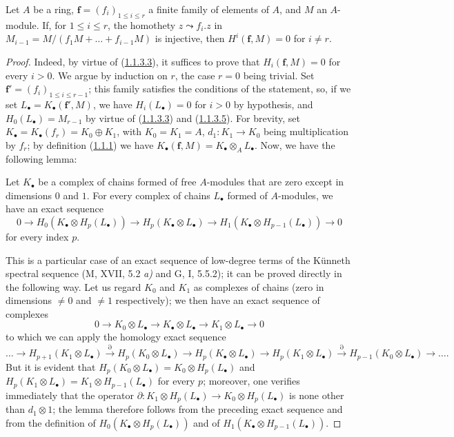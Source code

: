 \begin{proposition}[1.1.4]
\label{III.1.1.4}
Let $A$ be a ring, $\mathbf f=(f_i)_{1\leq i\leq r}$ a finite family
of elements of $A$, and $M$ an $A$-module. If, for $1\leq i\leq r$, the
homothety $z\leadsto f_i.z$ in $M_{i-1}=M/(f_1M+\ldots+f_{i-1}M)$ is injective,
then $H^i(\mathbf f,M)=0$ for $i\neq r$.
\end{proposition}

\begin{proof}
Indeed, by virtue of (\hyperref[III.1.1.3.3]{1.1.3.3}), it suffices to
prove that $H_i(\mathbf f,M)=0$ for every $i>0$. We argue by induction on
$r$, the case $r=0$ being trivial. Set
$\mathbf f'=(f_i)_{1\leq i\leq r-1}$; this family satisfies the conditions of
the statement, so, if we set $L_\bullet=K_\bullet(\mathbf f',M)$, we have
$H_i(L_\bullet)=0$ for $i>0$ by hypothesis, and
$H_0(L_\bullet)=M_{r-1}$ by virtue of
(\hyperref[III.1.1.3.3]{1.1.3.3}) and
(\hyperref[III.1.1.3.5]{1.1.3.5}). For brevity, set
$K_\bullet=K_\bullet(f_r)=K_0\oplus K_1$, with $K_0=K_1=A$,
$d_1:K_1\to K_0$ being multiplication by $f_r$; by definition
(\hyperref[III.1.1.1]{1.1.1}) we have
$K_\bullet(\mathbf f,M)=K_\bullet\otimes_A L_\bullet$. Now, we have the
following lemma:

\begin{lemma}[1.1.4.1]
\label{III.1.1.4.1}
Let $K_\bullet$ be a complex of chains formed of free $A$-modules that are
zero except in dimensions $0$ and $1$. For every complex of chains $L_\bullet$
formed of $A$-modules, we have an exact sequence
\[
0\longrightarrow H_0(K_\bullet\otimes H_p(L_\bullet))
\longrightarrow H_p(K_\bullet\otimes L_\bullet)
\longrightarrow H_1(K_\bullet\otimes H_{p-1}(L_\bullet))
\longrightarrow0
\]
for every index $p$.
\end{lemma}

This is a particular case of an exact sequence of low-degree terms of the
Künneth spectral sequence (M, XVII, 5.2 \emph{a)} and G, I, 5.5.2); it can be
proved directly in the following way. Let us regard $K_0$ and $K_1$ as
complexes of chains (zero in dimensions $\neq0$ and $\neq1$
respectively); we then have an exact sequence of complexes
\[
0\longrightarrow K_0\otimes L_\bullet
\longrightarrow K_\bullet\otimes L_\bullet
\longrightarrow K_1\otimes L_\bullet\longrightarrow0
\]
to which we can apply the homology exact sequence
\[
\ldots\longrightarrow H_{p+1}(K_1\otimes L_\bullet)
\xrightarrow{\partial}H_p(K_0\otimes L_\bullet)
\longrightarrow H_p(K_\bullet\otimes L_\bullet)
\longrightarrow H_p(K_1\otimes L_\bullet)
\xrightarrow{\partial}H_{p-1}(K_0\otimes L_\bullet)
\longrightarrow\ldots.
\]
But it is evident that
$H_p(K_0\otimes L_\bullet)=K_0\otimes H_p(L_\bullet)$ and
$H_p(K_1\otimes L_\bullet)=K_1\otimes H_{p-1}(L_\bullet)$ for every $p$;
moreover, one verifies immediately that the operator
$\partial:K_1\otimes H_p(L_\bullet)\to K_0\otimes H_p(L_\bullet)$ is none
other than $d_1\otimes1$; the lemma therefore follows from the preceding exact
sequence and from the definition of $H_0(K_\bullet\otimes H_p(L_\bullet))$ and
of $H_1(K_\bullet\otimes H_{p-1}(L_\bullet))$.


\end{proof}
